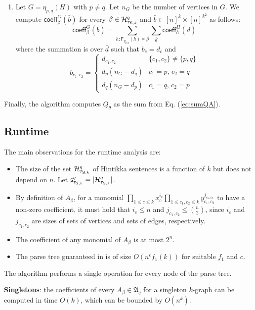 \documentclass{llncs}
\newcommand{\coeff}{\mathsf{coeff}}
\renewcommand{\mp}{\mathsf{F}}
\begin{document}
\begin{enumerate}
\item Let $G=\eta_{p,q}(H)$ with $p\not=q$. Let $n_G$ be the number of vertices in $G$. 
We compute $\coeff_{\beta}^{G}(\bar{b})$
for every $\beta\in\mathcal{H}_{\tau_{{\bf S},k}}^{q}$ and $\bar{b}\in[n]^{k}\times[n]^{k^2}$
as follows: 
\[
\coeff_{\beta}^{G}(\bar{b})=\sum_{h:\mp_{\eta_{p,q}}(h)\models\beta}\sum_{\bar{d}}\coeff_{h}^{H}(\bar{d})
\]
where the summation is over $\bar{d}$ such that $b_{c}=d_{c}$ and
\[
b_{c_{1},c_{2}}=\begin{cases}
d_{c_{1},c_{2}} & \{c_{1},c_{2}\}\not=\{p,q\}\\
d_{p}(n_G-d_{q}) & c_1 = p,\,c_2=q\\
d_{q}(n_G-d_{p}) & c_1 = q,\,c_2=p
\end{cases}
\]

\end{enumerate}

Finally, the algorithm computes $Q_{\theta}$
as the sum from Eq. (\ref{eq:sumQA}).
\subsection{Runtime}

The main observations for the runtime analysis are:
\begin{itemize}
\item The size of the set $\mathcal{H}_{\tau_{{\bf S},k}}^{q}$ of Hintikka
sentences is a function of $k$ but does not depend on $n$. Let $\mathsf{s}_{\tau_{{\bf S},k}}^{q}=|\mathcal{H}_{\tau_{{\bf S},k}}^{q}|$. 
\item By definition of $A_{\beta}$, for a monomial $\prod_{1\leq c\le k}x_{c}^{i_{c}}\prod_{1\leq c_{1},c_{2}\leq k}y_{c_{1},c_{2}}^{j_{c_{1},c_{2}}}$
to have a non-zero coefficient, it must hold that $i_{c}\leq n$ and
$j_{c_{1},c_{2}}\le\binom{n}{2}$, since $i_{c}$ and $j_{c_{1},c_{2}}$
are sizes of sets of vertices and sets of edges, respectively.
\item The coefficient of any monomial of $A_{\beta}$ is at most $2^{n}$. 
\item The parse tree guaranteed in \cite{ar:Oum2005,ar:SeymourOum2006}
is of size $O(n^{c}f_{1}(k))$ for suitable $f_{1}$ and $c$. 
\end{itemize}
The algorithm performs a single operation for every node of the parse
tree. 

\textbf{Singletons}: the coefficients of every $A_\beta\in\mathfrak{A}_q$ for a singleton $k$-graph
can be computed in time $O(k)$, which can be bounded by $O(n^{k})$. 
\end{document}
